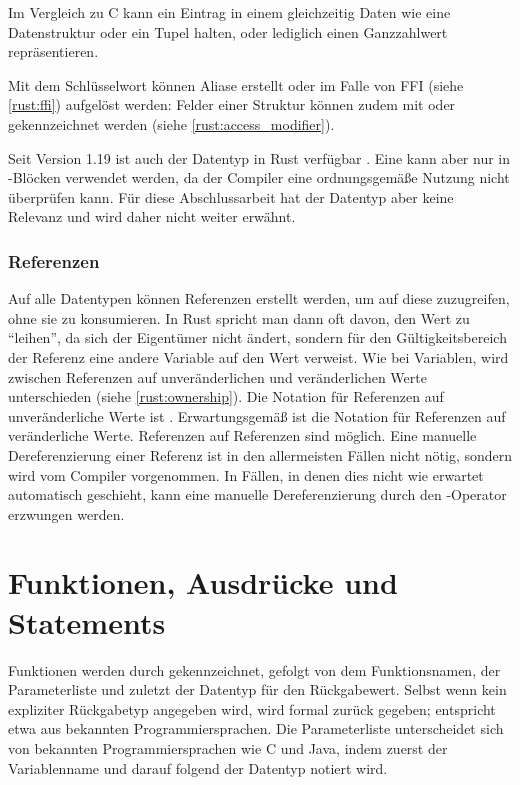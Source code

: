 Im Vergleich zu C kann ein Eintrag in einem  gleichzeitig Daten wie eine Datenstruktur oder ein Tupel halten, oder lediglich einen Ganzzahlwert repräsentieren.

Mit dem  Schlüsselwort können Aliase erstellt oder im Falle von FFI (siehe \autoref{rust:ffi}) aufgelöst werden: 
Felder einer Struktur können zudem mit  oder  gekennzeichnet werden (siehe \autoref{rust:access_modifier}).

Seit Version 1.19 ist auch der Datentyp  in Rust verfügbar \cite{rust:v1.19}.
Eine  kann aber nur in -Blöcken verwendet werden, da der Compiler eine ordnungsgemäße Nutzung nicht überprüfen kann.
Für diese Abschlussarbeit hat der Datentyp aber keine Relevanz und wird daher nicht weiter erwähnt.

\subsubsection{Referenzen}
\label{rust:reference}

Auf alle Datentypen können Referenzen erstellt werden, um auf diese zuzugreifen, ohne sie zu konsumieren.
In Rust spricht man dann oft davon, den Wert zu \enquote{leihen}, da sich der Eigentümer nicht ändert, sondern für den Gültigkeitsbereich der Referenz eine andere Variable auf den Wert verweist.
Wie bei Variablen, wird zwischen Referenzen auf unveränderlichen und veränderlichen Werte unterschieden (siehe \autoref{rust:ownership}).
Die Notation für Referenzen auf unveränderliche Werte ist .
Erwartungsgemäß ist  die Notation für Referenzen auf veränderliche Werte.
Referenzen auf Referenzen sind möglich.
Eine manuelle Dereferenzierung einer Referenz ist in den allermeisten Fällen nicht nötig, sondern wird vom Compiler vorgenommen.
In Fällen, in denen dies nicht wie erwartet automatisch geschieht, kann eine manuelle Dereferenzierung durch den \rustcinline{*}-Operator erzwungen werden.

\section{Funktionen, Ausdrücke und Statements}
\label{rust:fn}

Funktionen werden durch  gekennzeichnet, gefolgt von dem Funktionsnamen, der Parameterliste und zuletzt der Datentyp für den Rückgabewert.
Selbst wenn kein expliziter Rückgabetyp angegeben wird, wird formal \rustcinline{()} zurück gegeben; \rustcinline{()} entspricht etwa  aus bekannten Programmiersprachen.
Die Parameterliste unterscheidet sich von bekannten Programmiersprachen wie C und Java, indem zuerst der Variablenname und darauf folgend der Datentyp notiert wird.

